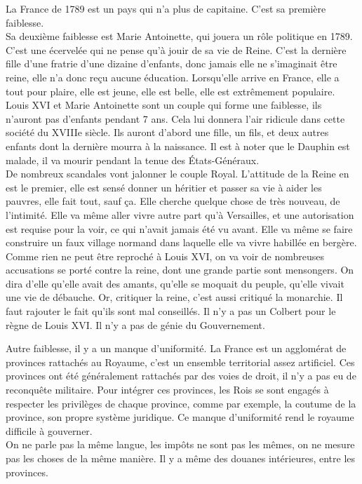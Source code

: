 \documentclass[10pt, a4paper, openany]{book}
\begin{document}
La France de 1789 est un pays qui n'a plus de capitaine. C'est sa première faiblesse. \\
Sa deuxième faiblesse est Marie Antoinette, qui jouera un rôle politique en 1789. C'est une écervelée qui ne pense qu'à jouir de sa vie de Reine. C'est la dernière fille d'une fratrie d'une dizaine d'enfants, donc jamais elle ne s'imaginait être reine, elle n'a donc reçu aucune éducation. Lorsqu'elle arrive en France, elle a tout pour plaire, elle est jeune, elle est belle, elle est extrêmement populaire. \\
Louis XVI et Marie Antoinette sont un couple qui forme une faiblesse, ils n'auront pas d'enfants pendant 7 ans. Cela lui donnera l'air ridicule dans cette société du XVIIIe siècle. Ils auront d'abord une fille, un fils, et deux autres enfants dont la dernière mourra à la naissance. Il est à noter que le Dauphin est malade, il va mourir pendant la tenue des États-Généraux. \\
De nombreux scandales vont jalonner le couple Royal. L'attitude de la Reine en est le premier, elle est sensé donner un héritier et passer sa vie à aider les pauvres, elle fait tout, sauf ça. Elle cherche quelque chose de très nouveau, de l'intimité. Elle va même aller vivre autre part qu'à Versailles, et une autorisation est requise pour la voir, ce qui n'avait jamais été vu avant. Elle va même se faire construire un faux village normand dans laquelle elle va vivre habillée en bergère. \\
Comme rien ne peut être reproché à Louis XVI, on va voir de nombreuses accusations se porté contre la reine, dont une grande partie sont mensongers. On dira d'elle qu'elle avait des amants, qu'elle se moquait du peuple, qu'elle vivait une vie de débauche. Or, critiquer la reine, c'est aussi critiqué la monarchie. Il faut rajouter le fait qu'ils sont mal conseillés. Il n'y a pas un Colbert pour le règne de Louis XVI. Il n'y a pas de génie du Gouvernement.


Autre faiblesse, il y a un manque d'uniformité. La France est un agglomérat de provinces rattachés au Royaume, c'est un ensemble territorial assez artificiel. Ces provinces ont été généralement rattachés par des voies de droit, il n'y a pas eu de reconquête militaire. Pour intégrer ces provinces, les Rois se sont engagés à respecter les privilèges de chaque province, comme par exemple, la coutume de la province, son propre système juridique. Ce manque d'uniformité rend le royaume difficile à gouverner. \\
On ne parle pas la même langue, les impôts ne sont pas les mêmes, on ne mesure pas les choses de la même manière. Il y a même des douanes intérieures, entre les provinces. 
\end{document}
